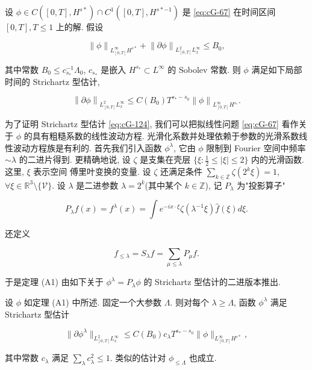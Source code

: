 \begin{theorem}[A1]\label{thm:cG-6.7}
设 $\phi \in C([0, T], H^{s*})\cap C^1([0, T], H^{s*-1})$ 是 \eqref{eq:cG-67} 在时间区间 $[0, T], T\leq 1$ 上的解. 假设

\begin{equation}
\left\|\phi\right\|_{L_{[0, T]}^{\infty}H^{s *}} + \left\|\partial\phi\right\|_{L_{[0, T]}^{2}L_{x}^{\infty}} \leq B_{0}, \label{eq:cG-123}
\end{equation}

其中常数 $B_0 \leq c_{s_*}^{-1}\Lambda_0$, $c_{s_*}$ 是嵌入 $H^{s_*} \subset L^\infty$ 的 Sobolev 常数. 则 $\phi$ 满足如下局部时间的 Strichartz 型估计, 

\begin{equation}
\left\|\partial\phi\right\|_{L_{[0, T]}^{2}L_{x}^{\infty}} \leq C(B_{0})T^{s_{*} - s_{0}}\left\|\phi\right\|_{L_{[0, T]}^{\infty}H^{s_{*}}}.\label{eq:cG-124}
\end{equation}
\end{theorem}


为了证明 Strichartz 型估计 \eqref{eq:cG-124}, 我们可以把拟线性问题 \eqref{eq:cG-67} 看作关于 $\phi$ 的具有粗糙系数的线性波动方程. 光滑化系数并处理依赖于参数的光滑系数线性波动方程族是有利的. 首先我们引入函数 $\phi^{\lambda}$, 它由 $\phi$ 限制到 Fourier 空间中频率 $\sim \lambda$ 的二进片得到. 更精确地说, 设 $\zeta$ 是支集在壳层 $\{\xi : \frac{1}{2} \leq |\xi| \leq 2\}$ 内的光滑函数. 这里, $\xi$ 表示空间 傅里叶变换的变量. 设 $\zeta$ 还满足条件 $\sum_{k \in \mathbb{Z}} \zeta(2^k\xi) = 1$, $\forall \xi \in \mathbb{R}^{3} \setminus \{\mathcal{V}\}$. 设 $\lambda$ 是二进参数 $\lambda = 2^k$(其中某个 $k \in \mathbb{Z}$), 记 $P_{\lambda}$ 为"投影算子"

\[
P_{\lambda}f(x) = f^{\lambda}(x) = \int e^{-ix\cdot\xi}\zeta(\lambda^{-1}\xi)\hat{f}(\xi)d\xi.
\]

还定义

\[
f_{\leq \lambda} = S_{\lambda}f = \sum_{\mu \leq \lambda}P_{\mu}f.
\]

于是定理 (A1) 由如下关于 $\phi^{\lambda} = P_{\lambda}\phi$ 的 Strichartz 型估计的二进版本推出. 

\begin{theorem}[A2]\label{thm:cG-6.9}
设 $\phi$ 如定理 (A1) 中所述. 固定一个大参数 $\Lambda$. 则对每个 $\lambda \geq \Lambda$, 函数 $\phi^{\lambda}$ 满足 Strichartz 型估计

\begin{equation}
\|\partial\phi^{\lambda}\|_{L_{[0, T]}^{2}L_{x}^{\infty}} \leq C(B_{0})c_{\lambda}T^{s_{*} - s_{0}}\|\phi\|_{L_{[0, T]}^{\infty}H^{s *}}, \label{eq:cG-125}
\end{equation}

其中常数 $c_{\lambda}$ 满足 $\sum_{\lambda}c_{\lambda}^{2}\leq 1$. 类似的估计对 $\phi_{\leq \Lambda}$ 也成立. 
\end{theorem}

